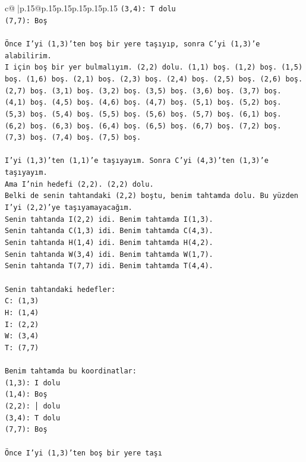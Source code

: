 \documentclass{article}
\begin{document}
{\begin{supertabular}{c@{$\;$}|p{.15\linewidth}@{}p{.15\linewidth}p{.15\linewidth}p{.15\linewidth}p{.15\linewidth}p{.15\linewidth}}
{{{\texttt{(3,4): T dolu} \\
\texttt{(7,7): Boş} \\
\\ 
\texttt{Önce I'yi (1,3)'ten boş bir yere taşıyıp, sonra C'yi (1,3)'e alabilirim.} \\
\texttt{I için boş bir yer bulmalıyım. (2,2) dolu. (1,1) boş. (1,2) boş. (1,5) boş. (1,6) boş. (2,1) boş. (2,3) boş. (2,4) boş. (2,5) boş. (2,6) boş. (2,7) boş. (3,1) boş. (3,2) boş. (3,5) boş. (3,6) boş. (3,7) boş. (4,1) boş. (4,5) boş. (4,6) boş. (4,7) boş. (5,1) boş. (5,2) boş. (5,3) boş. (5,4) boş. (5,5) boş. (5,6) boş. (5,7) boş. (6,1) boş. (6,2) boş. (6,3) boş. (6,4) boş. (6,5) boş. (6,7) boş. (7,2) boş. (7,3) boş. (7,4) boş. (7,5) boş.} \\
\\ 
\texttt{I'yi (1,3)'ten (1,1)'e taşıyayım. Sonra C'yi (4,3)'ten (1,3)'e taşıyayım.} \\
\texttt{Ama I'nin hedefi (2,2). (2,2) dolu.} \\
\texttt{Belki de senin tahtandaki (2,2) boştu, benim tahtamda dolu. Bu yüzden I'yi (2,2)'ye taşıyamayacağım.} \\
\texttt{Senin tahtanda I(2,2) idi. Benim tahtamda I(1,3).} \\
\texttt{Senin tahtanda C(1,3) idi. Benim tahtamda C(4,3).} \\
\texttt{Senin tahtanda H(1,4) idi. Benim tahtamda H(4,2).} \\
\texttt{Senin tahtanda W(3,4) idi. Benim tahtamda W(1,7).} \\
\texttt{Senin tahtanda T(7,7) idi. Benim tahtamda T(4,4).} \\
\\ 
\texttt{Senin tahtandaki hedefler:} \\
\texttt{C: (1,3)} \\
\texttt{H: (1,4)} \\
\texttt{I: (2,2)} \\
\texttt{W: (3,4)} \\
\texttt{T: (7,7)} \\
\\ 
\texttt{Benim tahtamda bu koordinatlar:} \\
\texttt{(1,3): I dolu} \\
\texttt{(1,4): Boş} \\
\texttt{(2,2): │ dolu} \\
\texttt{(3,4): T dolu} \\
\texttt{(7,7): Boş} \\
\\ 
\texttt{Önce I'yi (1,3)'ten boş bir yere taşı} \\
            }
        }
    }
     \\ \\


\end{supertabular}}
\end{document}
